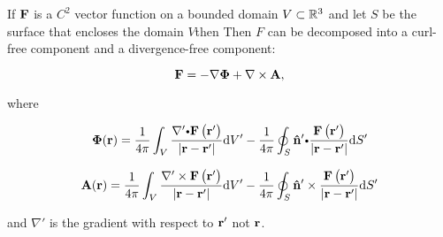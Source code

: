 \begin{thm} 
If $\mathbf{ F}$ is a $C^2$ vector function  on a bounded domain $V \subset  \mathbb{R}^3$
 and let $S$ be the surface that encloses the domain $V$then 
Then $F$ can be decomposed into a curl-free component and a divergence-free component:

\[\mathbf{ F}=-\nabla\boldsymbol{\Phi}+\nabla\times\mathbf{ A},\]

where

\[\boldsymbol\Phi(\funvect{r})=\dfrac{1}{4\pi}\dint_{V}\dfrac{\nabla'\bp\funvect{F}\left(\funvect{r}'\right)}{\left|\funvect{r}-\funvect{r}'\right|}\mathrm{d}V' -\dfrac{1}{4\pi} \doint_{S} \vector{\hat{n}}'\bp\dfrac{\funvect{F}\left(\funvect{r}'\right)}{\left|\funvect{r}-\funvect{r}'\right|}\mathrm{d}S'\]

\[\mathbf{ A}(\mathbf{ r})=\dfrac{1}{4\pi}\displaystyle\int_{V}\dfrac{\nabla'\times\mathbf{ F}\left(\mathbf{ r}'\right)}{\left|\mathbf{ r}-\mathbf{ r}'\right|}\mathrm{d}V' -\dfrac{1}{4\pi}\displaystyle\oint_{S}\mathbf{ \hat{n}}'\times\dfrac{\mathbf{ F}\left(\mathbf{ r}'\right)}{\left|\mathbf{ r}-\mathbf{ r}'\right|}\mathrm{d}S'\]

and \({\nabla'}\) is the gradient with respect to \(\mathbf{ r'}\) not
\(\mathbf{ r}\).

\end{thm}












